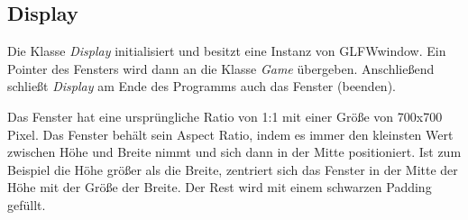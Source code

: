 \documentclass[doktyp=studarbeit]{TUBAFarbeiten}
\begin{document}
\subsection{Display}

Die Klasse \textit{Display} initialisiert und besitzt eine Instanz von GLFWwindow. 
Ein Pointer des Fensters wird dann an die Klasse \textit{Game} übergeben. 
Anschließend schließt \textit{Display} am Ende des Programms auch das Fenster 
(beenden).

Das Fenster hat eine ursprüngliche Ratio von 1:1 mit einer Größe von 700x700 Pixel.
Das Fenster behält sein Aspect Ratio, indem es immer den kleinsten Wert 
zwischen Höhe und Breite nimmt und sich dann in der Mitte positioniert. Ist zum Beispiel die Höhe größer als die Breite, zentriert sich das 
Fenster in der Mitte der Höhe mit der Größe der Breite. Der Rest
wird mit einem schwarzen Padding gefüllt.
\end{document}
